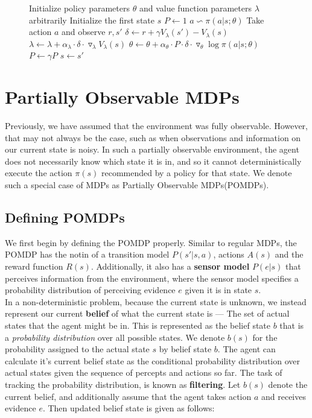 \documentclass[11pt]{article}
\begin{document}
\begin{figure}[!htb]
\begin{algorithmic}
\State Initialize policy parameters $\theta$ and value function parameters $\lambda$ arbitrarily
\State Initialize the first state $s$
\State $P \leftarrow 1$
\State $a \backsim \pi(a|s;\theta)$
\State Take action $a$ and observe $r, s'$
\State $\delta \leftarrow r + \gamma V_{\lambda}(s') - V_{\lambda}(s)$
\State $\lambda \leftarrow \lambda + \alpha_{\lambda} \cdot \delta \cdot \triangledown_{\lambda} V_{\lambda}(s)$
\State $\theta \leftarrow \theta + \alpha_{\theta} \cdot P \cdot \delta \cdot \triangledown_{\theta} \log \pi(a | s ; \theta)$
\State $P \leftarrow \gamma P$
\State $s \leftarrow s'$
\EndWhile
\EndFor
\EndProcedure
\end{algorithmic}
\end{figure}

\pagebreak
\section{Partially Observable MDPs}

Previously, we have assumed that the environment was fully observable. However, that may not always be the case, such as when observations and information on our current state is noisy. In such a partially observable environment, the agent does not necessarily know which state it is in, and so it cannot deterministically execute the action $\pi(s)$ recommended by a policy for that state. We denote such a special case of MDPs as Partially Observable MDPs(POMDPs).

\subsection{Defining POMDPs}

We first begin by defining the POMDP properly. Similar to regular MDPs, the POMDP has the notin of a transition model $P(s' | s, a)$, actions $A(s)$ and the reward function $R(s)$. Additionally, it also has a \textbf{sensor model} $P(e | s)$ that perceives information from the environment, where the sensor model specifies a probability distribution of perceiving evidence $e$ given it is in state $s$.\\

In a non-deterministic problem, because the current state is unknown, we instead represent our current \textbf{belief} of what the current state is --- The set of actual states that the agent might be in. This is represented as the belief state $b$ that is a \textit{probability distribution} over all possible states. We denote $b(s)$ for the probability assigned to the actual state $s$ by belief state $b$. The agent can calculate it's current belief state as the conditional probability distribution over actual states given the sequence of percepts and actions so far. The task of tracking the probability distribution, is known as \textbf{filtering}. Let $b(s)$ denote the current belief, and additionally assume that the agent takes action $a$ and receives evidence $e$. Then updated belief state is given as follows:
\end{document}
